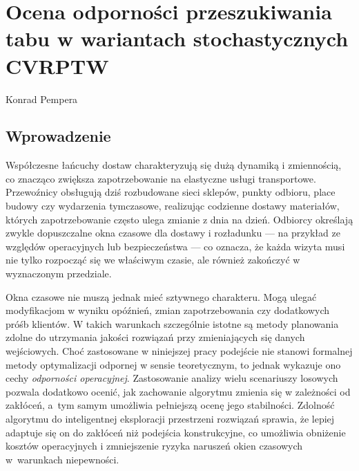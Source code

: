 \chapter[Ocena odporności \ldots]{Ocena odporności przeszukiwania tabu w wariantach stochastycznych CVRPTW}

\thispagestyle{empty}
\vspace{-8mm} {\large Konrad Pempera} \vspace{8mm}


\section{Wprowadzenie}

Współczesne łańcuchy dostaw charakteryzują się dużą dynamiką i zmiennością, co znacząco zwiększa zapotrzebowanie na elastyczne usługi transportowe. Przewoźnicy obsługują dziś rozbudowane sieci sklepów, punkty odbioru, place budowy czy wydarzenia tymczasowe, realizując codzienne dostawy materiałów, których zapotrzebowanie często ulega zmianie z dnia na dzień. Odbiorcy określają zwykle dopuszczalne okna czasowe dla dostawy i rozładunku — na przykład ze względów operacyjnych lub bezpieczeństwa — co oznacza, że każda wizyta musi nie tylko rozpocząć się we właściwym czasie, ale również zakończyć w wyznaczonym przedziale.

Okna czasowe nie muszą jednak mieć sztywnego charakteru. Mogą ulegać modyfikacjom w wyniku opóźnień, zmian zapotrzebowania czy dodatkowych próśb klientów. W takich warunkach szczególnie istotne są metody planowania zdolne do utrzymania jakości rozwiązań przy zmieniających się danych wejściowych. Choć zastosowane w niniejszej pracy podejście nie stanowi formalnej metody optymalizacji odpornej w sensie teoretycznym, to jednak wykazuje ono cechy \emph{odporności operacyjnej}. Zastosowanie analizy wielu scenariuszy losowych pozwala dodatkowo ocenić, jak zachowanie algorytmu zmienia się w zależności od zakłóceń, a~tym samym umożliwia pełniejszą ocenę jego stabilności. Zdolność algorytmu do inteligentnej eksploracji przestrzeni rozwiązań sprawia, że lepiej adaptuje się on do zakłóceń niż podejścia konstrukcyjne, co umożliwia obniżenie kosztów operacyjnych i zmniejszenie ryzyka naruszeń okien czasowych w~warunkach niepewności.

